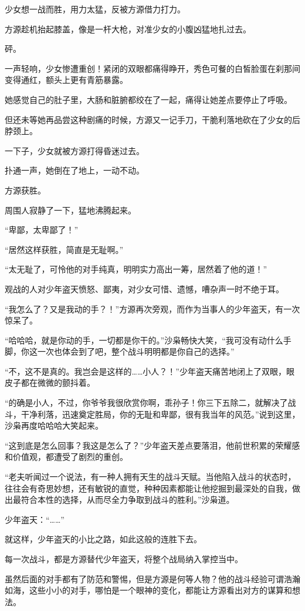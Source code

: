 \begin{this_body}
少女想一战而胜，用力太猛，反被方源借力打力。

方源趁机抬起膝盖，像是一杆大枪，对准少女的小腹凶猛地扎过去。

砰。

一声轻响，少女惨遭重创！紧闭的双眼都痛得睁开，秀色可餐的白皙脸蛋在刹那间变得通红，额头上更有青筋暴露。

她感觉自己的肚子里，大肠和脏腑都绞在了一起，痛得让她差点要停止了呼吸。

但还未等她再品尝这种剧痛的时候，方源又一记手刀，干脆利落地砍在了少女的后脖颈上。

一下子，少女就被方源打得昏迷过去。

扑通一声，她倒在了地上，一动不动。

方源获胜。

周围人寂静了一下，猛地沸腾起来。

“卑鄙，太卑鄙了！”

“居然这样获胜，简直是无耻啊。”

“太无耻了，可怜他的对手纯真，明明实力高出一筹，居然着了他的道！”

观战的人对少年盗天愤怒、鄙夷，对少女可惜、遗憾，嘈杂声一时不绝于耳。

“我怎么了？又是我动的手？！”方源再次旁观，而作为当事人的少年盗天，有一次惊呆了。

“哈哈哈，就是你动的手，一切都是你干的。”沙枭畅快大笑，“我可没有动什么手脚，你这一次也体会到了吧，整个战斗明明都是你自己的选择。”

“不，这不是真的。我岂会是这样的……小人？！”少年盗天痛苦地闭上了双眼，眼皮子都在微微的颤抖着。

“的确是小人，不过，你爷爷我很欣赏你啊，乖孙子！你三下五除二，就解决了战斗，干净利落，迅速奠定胜局，你的无耻和卑鄙，很有我当年的风范。”说到这里，沙枭再度哈哈哈大笑起来。

“这到底是怎么回事？我这是怎么了？”少年盗天差点要落泪，他前世积累的荣耀感和价值观，都遭受了剧烈的重创。

“老夫听闻过一个说法，有一种人拥有天生的战斗天赋。当他陷入战斗的状态时，往往会有奇思妙想，还有敏锐的直觉，种种因素都能让他挖掘到最深处的自我，做出最符合本性的选择，从而尽全力争取到战斗的胜利。”沙枭道。

少年盗天：“……”

就这样，少年盗天的小比之路，如此这般的连胜下去。

每一次战斗，都是方源替代少年盗天，将整个战局纳入掌控当中。

虽然后面的对手都有了防范和警惕，但是方源是何等人物？他的战斗经验可谓浩瀚如海，这些小小的对手，哪怕是一个眼神的变化，都能让方源看出对方的谋算和想法。


\end{this_body}
